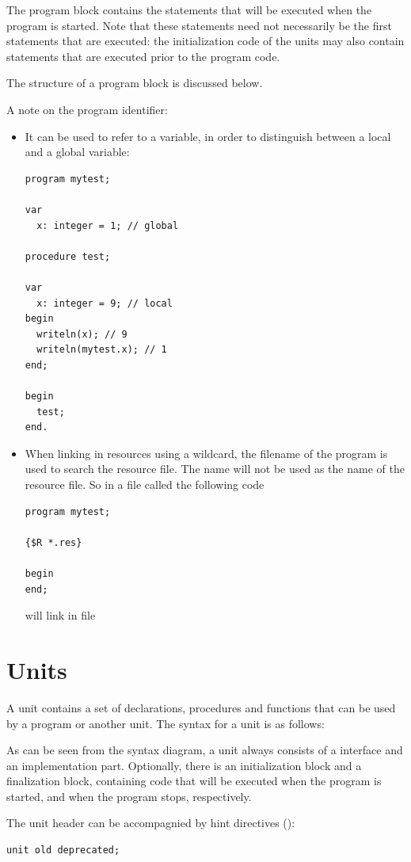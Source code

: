 The program block contains the statements that will be executed when the
program is started. Note that these statements need not necessarily be the
first statements that are executed: the initialization code of the units
may also contain statements that are executed prior to the program code.

The structure of a program block is discussed below.

A note on the program identifier: 
\begin{itemize}
\item It can be used to refer to a variable, in order to distinguish between
a local and a global variable:
\begin{verbatim}
program mytest;

var 
  x: integer = 1; // global

procedure test;

var 
  x: integer = 9; // local
begin
  writeln(x); // 9
  writeln(mytest.x); // 1
end;

begin
  test;
end.
\end{verbatim}
\item When linking in resources using a wildcard, the filename of the program is
used to search the resource file. The name will not be used as the name of the 
resource file. So in a file called  the following code
\begin{verbatim}
program mytest;

{$R *.res}

begin
end;
\end{verbatim}
will link in file 
\end{itemize}

\section{Units}
A unit contains a set of declarations, procedures and functions that can be
used by a program or another unit.
The syntax for a unit is as follows:

As can be seen from the syntax diagram, a unit always consists of a
interface and an implementation part. Optionally, there is an initialization
block and a finalization block, containing code that will be executed when
the program is started, and when the program stops, respectively.

The unit header can be accompagnied by hint directives
():
\begin{verbatim}
unit old deprecated;
\end{verbatim}

